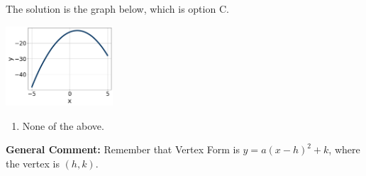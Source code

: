 \documentclass{extbook}[14pt]
\begin{document}
\begin{enumerate}
{The solution is the graph below, which is option C.
\begin{center}
    \includegraphics[width=0.3\textwidth]{../Figures/quadraticEquationToGraphCA.png}
\end{center}\begin{enumerate}[label=\Alph*.]
\item None of the above.\end{enumerate}
\textbf{General Comment:} Remember that Vertex Form is $y = a(x-h)^2+k$, where the vertex is $(h, k)$.
}
\end{enumerate}
\end{document}
